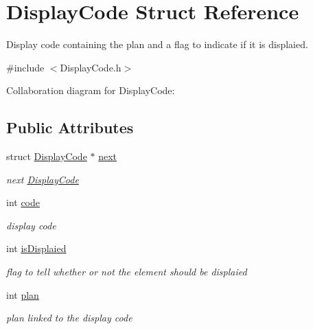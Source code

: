 \hypertarget{structDisplayCode}{}\section{Display\+Code Struct Reference}
\label{structDisplayCode}


Display code containing the plan and a flag to indicate if it is displaied.  




{\ttfamily \#include $<$Display\+Code.\+h$>$}



Collaboration diagram for Display\+Code\+:
\subsection*{Public Attributes}
\begin{DoxyCompactItemize}
\item 
struct \hyperlink{structDisplayCode}{Display\+Code} $\ast$ \hyperlink{structDisplayCode_aad039ce333a70fec29d3a2532b68dbf6}{next}\hypertarget{structDisplayCode_aad039ce333a70fec29d3a2532b68dbf6}{}\label{structDisplayCode_aad039ce333a70fec29d3a2532b68dbf6}

\begin{DoxyCompactList}\small\item\em next \hyperlink{structDisplayCode}{Display\+Code} \end{DoxyCompactList}\item 
int \hyperlink{structDisplayCode_a6de1e7dd7c1bc2905df019ef13858642}{code}\hypertarget{structDisplayCode_a6de1e7dd7c1bc2905df019ef13858642}{}\label{structDisplayCode_a6de1e7dd7c1bc2905df019ef13858642}

\begin{DoxyCompactList}\small\item\em display code \end{DoxyCompactList}\item 
int \hyperlink{structDisplayCode_a11f90a324991b3b5e13721e7c7be59df}{is\+Displaied}\hypertarget{structDisplayCode_a11f90a324991b3b5e13721e7c7be59df}{}\label{structDisplayCode_a11f90a324991b3b5e13721e7c7be59df}

\begin{DoxyCompactList}\small\item\em flag to tell whether or not the element should be displaied \end{DoxyCompactList}\item 
int \hyperlink{structDisplayCode_aa6eee6772ad5cb410437a3923c9f3cd6}{plan}\hypertarget{structDisplayCode_aa6eee6772ad5cb410437a3923c9f3cd6}{}\label{structDisplayCode_aa6eee6772ad5cb410437a3923c9f3cd6}

\begin{DoxyCompactList}\small\item\em plan linked to the display code \end{DoxyCompactList}\end{DoxyCompactItemize}


